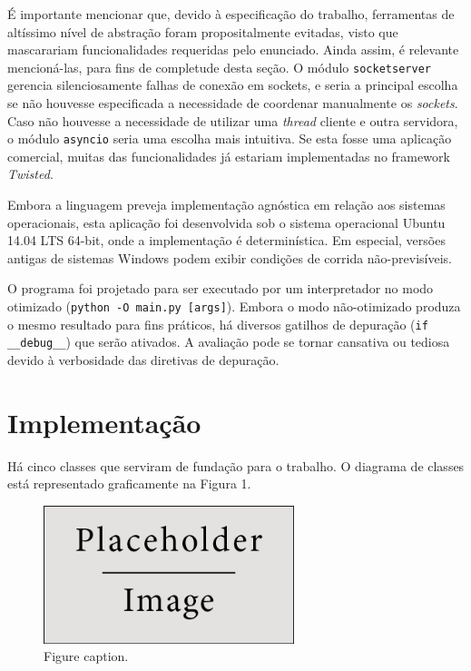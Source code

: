 \documentclass[a4paper,12pt]{article}
\begin{document}
            É importante mencionar que, devido à especificação do trabalho, ferramentas de altíssimo nível de abstração foram propositalmente evitadas, visto que mascarariam funcionalidades requeridas pelo enunciado.
            Ainda assim, é relevante mencioná-las, para fins de completude desta seção.
            O módulo \texttt{socketserver} gerencia silenciosamente falhas de conexão em sockets, e seria a principal escolha se não houvesse especificada a necessidade de coordenar manualmente os \emph{sockets}.
            Caso não houvesse a necessidade de utilizar uma \emph{thread} cliente e outra servidora, o módulo \texttt{asyncio} seria uma escolha mais intuitiva.
            Se esta fosse uma aplicação comercial, muitas das funcionalidades já estariam implementadas no framework \emph{Twisted}.

            Embora a linguagem preveja implementação agnóstica em relação aos sistemas operacionais, esta aplicação foi desenvolvida sob o sistema operacional Ubuntu 14.04 LTS 64-bit, onde a implementação é determinística\cite{WEBSITE:8}.
            Em especial, versões antigas de sistemas Windows podem exibir condições de corrida não-previsíveis.

            O programa foi projetado para ser executado por um interpretador no modo otimizado (\texttt{python -O main.py [args]}).
            Embora o modo não-otimizado produza o mesmo resultado para fins práticos, há diversos gatilhos de depuração (\texttt{if \_\_debug\_\_}) que serão ativados.
            A avaliação pode se tornar cansativa ou tediosa devido à verbosidade das diretivas de depuração.

        
        \section{Implementação}
        
        Há cinco classes que serviram de fundação para o trabalho.
        O diagrama de classes está representado graficamente na Figura 1.

        \begin{figure}[h]
            \begin{center}
                \includegraphics[width=0.65\textwidth]{placeholder_1} %
                \caption{Figure caption.}
            \end{center}
        \end{figure}
\end{document}

